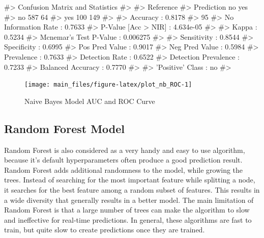 \begin{Schunk}
\begin{Soutput}
#> Confusion Matrix and Statistics
#> 
#>           Reference
#> Prediction  no yes
#>        no  587  64
#>        yes 100 149
#>                                          
#>                Accuracy : 0.8178         
#>                  95%
#>     No Information Rate : 0.7633         
#>     P-Value [Acc > NIR] : 4.634e-05      
#>                                          
#>                   Kappa : 0.5234         
#>  Mcnemar's Test P-Value : 0.006275       
#>                                          
#>             Sensitivity : 0.8544         
#>             Specificity : 0.6995         
#>          Pos Pred Value : 0.9017         
#>          Neg Pred Value : 0.5984         
#>              Prevalence : 0.7633         
#>          Detection Rate : 0.6522         
#>    Detection Prevalence : 0.7233         
#>       Balanced Accuracy : 0.7770         
#>                                          
#>        'Positive' Class : no             
#> 
\end{Soutput}
\end{Schunk}

\begin{Schunk}
\begin{figure}[H]

{\centering \texttt{[image: main\_files/figure-latex/plot\_nb\_ROC-1]} 

}

\caption[Naive Bayes Model AUC and ROC Curve]{Naive Bayes Model AUC and ROC Curve}\label{fig:plot_nb_ROC}
\end{figure}
\end{Schunk}

\hypertarget{random-forest-model}{%
\subsection{Random Forest Model}\label{random-forest-model}}

Random Forest is also considered as a very handy and easy to use
algorithm, because it's default hyperparameters often produce a good
prediction result. Random Forest adds additional randomness to the
model, while growing the trees. Instead of searching for the most
important feature while splitting a node, it searches for the best
feature among a random subset of features. This results in a wide
diversity that generally results in a better model. The main limitation
of Random Forest is that a large number of trees can make the algorithm
to slow and ineffective for real-time predictions. In general, these
algorithms are fast to train, but quite slow to create predictions once
they are trained.

